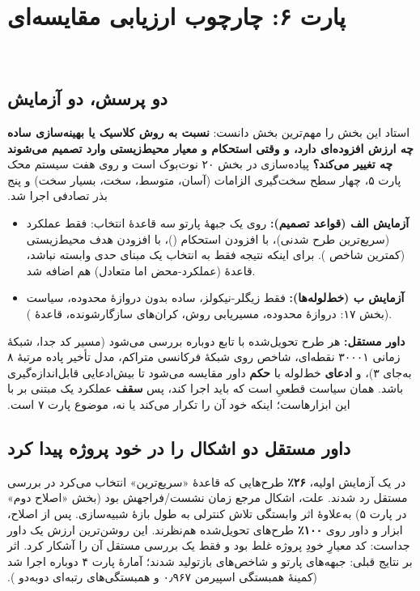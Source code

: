 ‫\documentclass[a4paper,12pt]{article}
\begin{document}
‫
‫\section{پارت ۶: چارچوب ارزیابی مقایسه‌ای}
‫
‫\subsection{دو پرسش، دو آزمایش}
‫استاد این بخش را مهم‌ترین بخش دانست: \textbf{ نسبت به روش کلاسیک یا بهینه‌سازی ساده چه ارزش افزوده‌ای دارد، و وقتی استحکام و معیار محیط‌زیستی وارد تصمیم می‌شوند چه تغییر می‌کند؟} پیاده‌سازی در بخش ۲۰ نوت‌بوک است و روی هفت سیستم محک پارت ۵، چهار سطح سخت‌گیری الزامات (آسان، متوسط، سخت، بسیار سخت) و پنج بذر تصادفی اجرا شد.
‫\begin{itemize}
‫\item \textbf{آزمایش الف (قواعد تصمیم):} روی یک جبههٔ پارتو سه قاعدهٔ انتخاب:  فقط عملکرد (سریع‌ترین طرح شدنی)،  با افزودن استحکام ()،  با افزودن هدف محیط‌زیستی (کمترین شاخص ). برای اینکه نتیجه فقط به انتخاب یک مبنای حدی وابسته نباشد، قاعدهٔ  (عملکرد-محض اما متعادل) هم اضافه شد.
‫\item \textbf{آزمایش ب (خط‌لوله‌ها):}  فقط زیگلر-نیکولز،   ساده بدون دروازهٔ محدوده،  سیاست  (بخش ۱۷: دروازهٔ محدوده، مسیریابی روش، کران‌های سازگارشونده، قاعدهٔ ).
‫\end{itemize}
‫\textbf{داور مستقل:} هر طرح تحویل‌شده با تابع \texttt{} دوباره بررسی می‌شود (مسیر کد جدا، شبکهٔ زمانی ۳۰۰۰۱ نقطه‌ای، شاخص  روی شبکهٔ فرکانسی متراکم، مدل تأخیر پاده مرتبهٔ ۸ به‌جای ۳)، و \textbf{ادعای} خط‌لوله با \textbf{حکم} داور مقایسه می‌شود تا بیش‌ادعایی قابل‌اندازه‌گیری باشد.  همان سیاست قطعیِ است که  باید اجرا کند، پس \textbf{سقف} عملکرد یک  مبتنی بر  با این ابزارهاست؛ اینکه خود  آن را تکرار می‌کند یا نه، موضوع پارت ۷ است.
‫
‫\subsection{داور مستقل دو اشکال را در خود پروژه پیدا کرد}
‫در یک آزمایش اولیه، \textbf{۲۶٪} طرح‌هایی که قاعدهٔ «سریع‌ترین» انتخاب می‌کرد در بررسی مستقل رد شدند. علت، اشکال مرجع زمان نشست/فراجهش بود (بخش «اصلاح دوم» در پارت ۵) به‌علاوهٔ اثر وابستگی تلاش کنترلی به طول بازهٔ شبیه‌سازی. پس از اصلاح، ابزار و داور روی \textbf{۱۰۰٪} طرح‌های تحویل‌شده هم‌نظرند. این روشن‌ترین ارزش یک داور جداست: کد معیارِ خودِ پروژه غلط بود و فقط یک بررسی مستقل آن را آشکار کرد. اثر بر نتایج قبلی: جبهه‌های پارتو و شاخص‌های  بازتولید شدند؛ آمارهٔ پارت ۴ دوباره اجرا شد (کمینهٔ همبستگی اسپیرمن ۰٫۹۶۷ و همبستگی‌های رتبه‌ای دوبه‌دو ).
\end{document}
